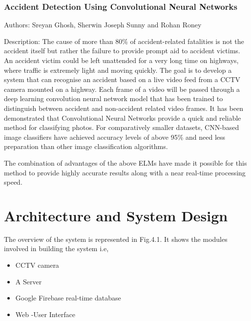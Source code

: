 \documentclass[ 12pt,a4paper,twocolumn,fleqn]{article}
\begin{document}
\begin{adjustwidth}{3.5em}{0pt}
\hspace{0.2cm}

\subsubsection{Accident Detection Using Convolutional Neural Networks}

Authors:  Sreyan Ghosh, Sherwin Joseph Sunny and Rohan Roney

Description: The cause of more than 80\% of accident-related fatalities is not the accident itself but rather the failure to provide prompt aid to accident victims. An accident victim could be left unattended for a very long time on highways, where traffic is extremely light and moving quickly. The goal is to develop a system that can recognise an accident based on a live video feed from a CCTV camera mounted on a highway. Each frame of a video will be passed through a deep learning convolution neural network model that has been trained to distinguish between accident and non-accident related video frames. It has been demonstrated that Convolutional Neural Networks provide a quick and reliable method for classifying photos. For comparatively smaller datasets, CNN-based image classifiers have achieved accuracy levels of above 95\% and need less preparation than other image classification algorithms.


The combination of advantages of the above ELMs have made it possible for this method to provide highly accurate results along with a near real-time processing speed.

\newpage
  \pagestyle{fancy}
  
 \section{Architecture and System Design}
 
The overview of the system is represented in Fig.4.1. It shows the modules involved in building the system i.e,

\begin{itemize}
    \item CCTV camera
    \item A Server
    \item Google Firebase real-time database
    \item Web -User Interface
\end{itemize}

\newpage
  \pagestyle{fancy}
  

\end{adjustwidth}
\end{document}
